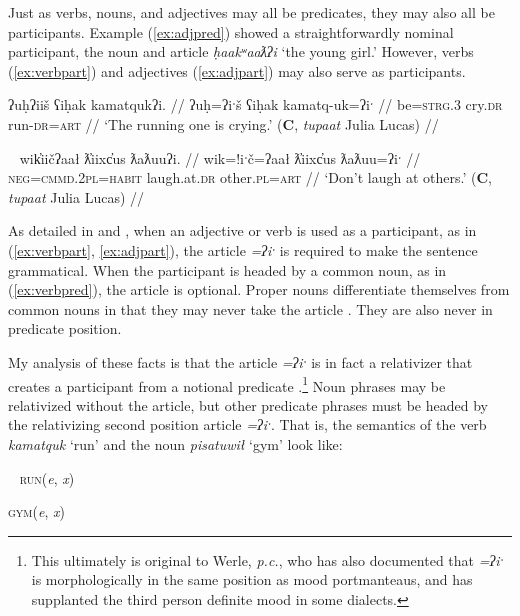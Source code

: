 Just as verbs, nouns, and adjectives may all be predicates, they may also all be participants. Example (\ref{ex:adjpred}) showed a straightforwardly nominal participant, the noun and article \textit{ḥaakʷaaƛʔi} `the young girl.' However, verbs (\ref{ex:verbpart}) and adjectives (\ref{ex:adjpart}) may also serve as participants.

\ex \label{ex:verbpart}
\begingl
\glpreamble ʔuḥʔiiš ʕiḥak kamatqukʔi. //
\gla ʔuḥ=ʔiˑš ʕiḥak kamatq-uk=ʔiˑ //
\glb be=\textsc{strg.3} cry.\textsc{dr} run-\textsc{dr}=\textsc{art} //
\glft `The running one is crying.' (\textbf{C}, \textit{tupaat} Julia Lucas) //
\endgl
\xe

\ex~ \label{ex:adjpart}
\begingl
\glpreamble wik̓iičʔaał ƛ̓iixc̓us ƛaƛuuʔi. //
\gla wik=!iˑč=ʔaał ƛ̓iixc̓us ƛaƛuu=ʔiˑ //
\glb \textsc{neg}=\textsc{cmmd.2pl}=\textsc{habit} laugh.at.\textsc{dr} other.\textsc{pl}=\textsc{art} //
\glft `Don't laugh at others.' (\textbf{C}, \textit{tupaat} Julia Lucas) //
\endgl
\xe


As detailed in \cite{jacobsen1979} and \cite{wojdak2001}, when an adjective or verb is used as a participant, as in (\ref{ex:verbpart}, \ref{ex:adjpart}), the article \textit{=ʔiˑ} is required to make the sentence grammatical. When the participant is headed by a common noun, as in (\ref{ex:verbpred}), the article is optional. Proper nouns differentiate themselves from common nouns in that they may never take the article \citep{inman2018}. They are also never in predicate position.

My analysis of these facts is that the article \textit{=ʔiˑ} is in fact a relativizer that creates a participant from a notional predicate \cite{inman2018}.\footnote{This ultimately is original to Werle, \textit{p.c.}, who has also documented that \textit{=ʔiˑ} is morphologically in the same position as mood portmanteaus, and has supplanted the third person definite mood in some dialects.} Noun phrases may be relativized without the article, but other predicate phrases must be headed by the relativizing second position article \textit{=ʔiˑ}. That is, the semantics of the verb \textit{kamatquk} `run' and the noun \textit{pisatuwił} `gym' look like:

\ex~
\textsc{run}(\textit{e}, \textit{x})

\textsc{gym}(\textit{e}, \textit{x})
\xe

